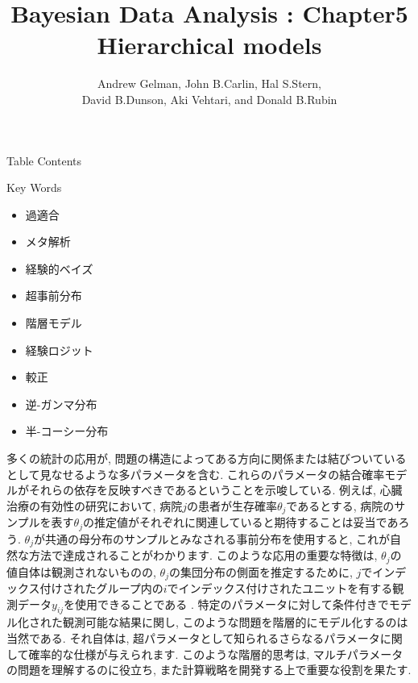 \documentclass[10pt,dvipdfmx,a4]{beamer}
\title{Bayesian Data Analysis : Chapter5 \\Hierarchical models}
\subtitle{Andrew Gelman, John B.Carlin, Hal S.Stern,\\David B.Dunson, Aki Vehtari, and Donald B.Rubin}
\begin{document}
\frame{\titlepage}

\begin{frame}{Table Contents}
\begin{multicols}{2}
{\scriptsize \tableofcontents}
\end{multicols}
\end{frame}

\begin{frame}{Key Words}
\begin{multicols}{2}
{\scriptsize \begin{itemize}
\item 過適合
\item メタ解析
\item 経験的ベイズ
\item 超事前分布
\item 階層モデル
\item 経験ロジット
\item 較正
\item 逆-ガンマ分布
\item 半-コーシー分布
\end{itemize}}
\end{multicols}
\end{frame}


\begin{frame}
多くの統計の応用が, 問題の構造によってある方向に関係または結びついているとして見なせるような多パラメータを含む.
これらのパラメータの結合確率モデルがそれらの依存を反映すべきであるということを示唆している.
例えば, 心臓治療の有効性の研究において, 病院$j$の患者が生存確率$\theta_j$であるとする, 病院のサンプルを表す$\theta_j$の推定値がそれぞれに関連していると期待することは妥当であろう.
$\theta_j$が共通の母分布のサンプルとみなされる事前分布を使用すると, これが自然な方法で達成されることがわかります.
このような応用の重要な特徴は, $\theta_j$の値自体は観測されないものの, $\theta_j$の集団分布の側面を推定するために, $j$でインデックス付けされたグループ内の$i$でインデックス付けされたユニットを有する観測データ$y_{ij}$を使用できることである .
特定のパラメータに対して条件付きでモデル化された観測可能な結果に関し, このような問題を階層的にモデル化するのは当然である.
それ自体は, 超パラメータとして知られるさらなるパラメータに関して確率的な仕様が与えられます.
このような階層的思考は, マルチパラメータの問題を理解するのに役立ち, また計算戦略を開発する上で重要な役割を果たす.
\end{frame}
\end{document}
